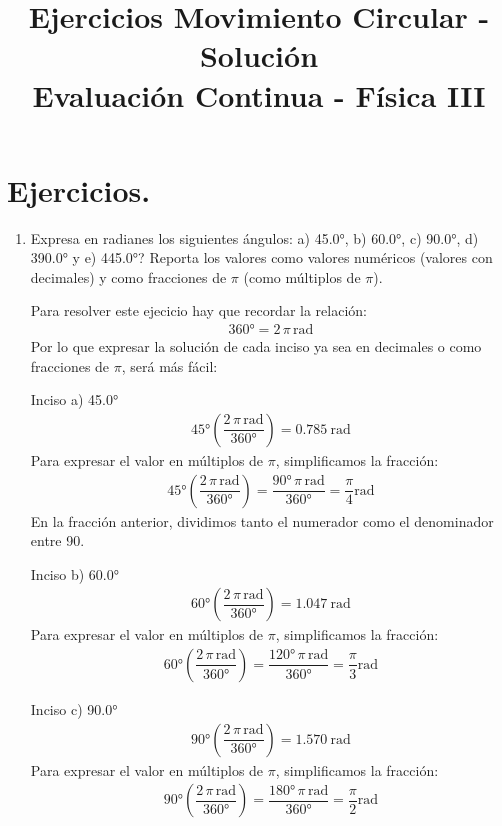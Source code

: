 \documentclass[14pt]{extarticle}
\title{\vspace*{-2cm} Ejercicios Movimiento Circular - Solución\\  Evaluación Continua - Física III\vspace{-5ex}}
\date{}
\begin{document}
\maketitle

\vspace*{0.75cm}

\section{Ejercicios.}

\begin{enumerate}
\item Expresa en radianes los siguientes ángulos: a) \ang{45.0}, b) \ang{60.0}, c) \ang{90.0}, \break d) \ang{390.0} y e) \ang{445.0}? Reporta los valores como valores numéricos (valores con decimales) y como fracciones de $\pi$ (como múltiplos de $\pi$).

Para resolver este ejecicio hay que recordar la relación:
\begin{align*}
\ang{360} = 2 \, \pi \, \unit{\radian}
\end{align*}
Por lo que expresar la solución de cada inciso ya sea en decimales o como fracciones de $\pi$, será más fácil:

Inciso a) \ang{45.0}
\begin{align*}
\ang{45} \left( \dfrac{2 \, \pi \, \unit{\radian}}{\ang{360}} \right) = \SI{0.785}{\radian}
\end{align*}
Para expresar el valor en múltiplos de $\pi$, simplificamos la fracción:
\begin{align*}
\ang{45} \left( \dfrac{2 \, \pi \, \unit{\radian}}{\ang{360}} \right) = \dfrac{\ang{90} \, \pi \, \unit{\radian}}{\ang{360}} = \dfrac{\pi}{4} \unit{\radian}
\end{align*}
En la fracción anterior, dividimos tanto el numerador como el denominador entre \num{90}.

Inciso b) \ang{60.0}
\begin{align*}
\ang{60} \left( \dfrac{2 \, \pi \, \unit{\radian}}{\ang{360}} \right) = \SI{1.047}{\radian}
\end{align*}
Para expresar el valor en múltiplos de $\pi$, simplificamos la fracción:
\begin{align*}
\ang{60} \left( \dfrac{2 \, \pi \, \unit{\radian}}{\ang{360}} \right) = \dfrac{\ang{120} \, \pi \, \unit{\radian}}{\ang{360}} = \dfrac{\pi}{3} \unit{\radian}
\end{align*}

Inciso c) \ang{90.0}
\begin{align*}
\ang{90} \left( \dfrac{2 \, \pi \, \unit{\radian}}{\ang{360}} \right) = \SI{1.570}{\radian}
\end{align*}
Para expresar el valor en múltiplos de $\pi$, simplificamos la fracción:
\begin{align*}
\ang{90} \left( \dfrac{2 \, \pi \, \unit{\radian}}{\ang{360}} \right) = \dfrac{\ang{180} \, \pi \, \unit{\radian}}{\ang{360}} = \dfrac{\pi}{2} \unit{\radian}
\end{align*}


\end{enumerate}
\end{document}
